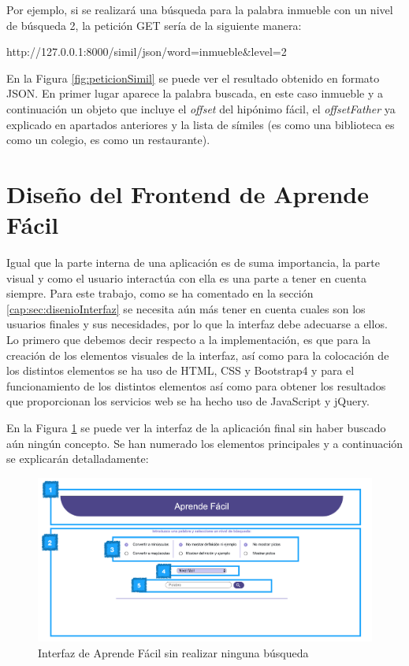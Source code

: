 Por ejemplo, si se realizará una búsqueda para la palabra inmueble con un nivel de búsqueda 2, la petición GET sería de la siguiente manera:

http://127.0.0.1:8000/simil/json/word=inmueble\&level=2

En la Figura \ref{fig:peticionSimil} se puede ver el resultado obtenido en formato JSON. En primer lugar aparece la palabra buscada, en este caso inmueble y a continuación un objeto que incluye el \textit{offset} del hipónimo fácil, el \textit{offsetFather}  ya explicado en apartados anteriores y la lista de símiles (es como una biblioteca es como un colegio, es como un restaurante).




\section{Diseño del Frontend  de Aprende Fácil}
Igual que la parte interna de una aplicación es de suma importancia, la parte visual y como el usuario interactúa con ella es una parte a tener en cuenta siempre. Para este trabajo, como se ha comentado en la sección \ref{cap:sec:disenioInterfaz}  se necesita aún más tener en cuenta cuales son los usuarios finales y sus necesidades, por lo que la interfaz debe adecuarse a ellos.
Lo primero que debemos decir respecto a la implementación, es que para la creación de los elementos visuales de la interfaz, así como para la colocación de los distintos elementos se ha uso de HTML, CSS y Bootstrap4 y para el funcionamiento de los distintos elementos así como para obtener los resultados que proporcionan los servicios web se ha hecho uso de JavaScript y jQuery.

En la Figura \ref{fig:paginaInicial} se puede ver la interfaz de la aplicación final sin haber buscado aún ningún concepto. Se han numerado los elementos principales y a continuación se explicarán detalladamente:

\begin{figure}[!h]
	\includegraphics[width=1.2\textwidth]{Imagenes/Bitmap/Capitulo4/Frontend/paginaInicial.png}
	\caption{Interfaz de Aprende Fácil  sin realizar ninguna búsqueda}
	\label{fig:paginaInicial}
\end{figure}


